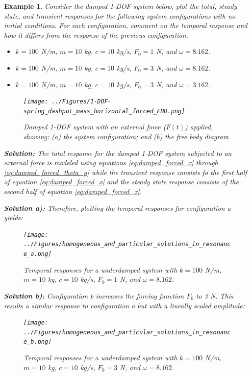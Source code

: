 \documentclass[12pt,letter]{article}
\newtheorem{ex}{Example}
\numberwithin{ex}{section} %
\newenvironment{example}{\begin{mdframed}[middlelinewidth=0.5mm]\begin{ex}\normalfont}{\end{ex}\end{mdframed}}
\numberwithin{re}{section} %
\begin{document}
			\begin{example}
			\label{ex:homogeneous_and_particular_solutions_in_resonance}		
				Consider the damped 1-DOF system below, plot the total, steady state, and transient responses for the following system configurations with no initial conditions. For each configuration, comment on the temporal response and how it differs from the response of the previous configuration.    
				
				\begin{itemize}
				\item[a)] $k=100$ N/m, $m=10$ kg,  $c=10$ kg/s, $F_0=1$ N, and $\omega = 8.162$.
				\item[b)] $k=100$ N/m, $m=10$ kg,  $c=10$ kg/s, $F_0=3$ N, and $\omega = 8.162$.
				\item[c)] $k=100$ N/m, $m=10$ kg,  $c=10$ kg/s, $F_0=3$ N, and $\omega = 3.162$.
				\end{itemize}
				
				\begin{figure}[H]
					\centering
					\texttt{[image: ../Figures/1-DOF-spring\_dashpot\_mass\_horizontal\_forced\_FBD.png]}
					\caption{Damped 1-DOF system with an external force ($F(t)$) applied, showing: (a) the system configuration; and (b) the free body diagram}
				\end{figure}
				
				\noindent\textbf{Solution:} The total response for the damped 1-DOF system subjected to an external force is modeled using equations \ref{eq:damped_forced_x} through \ref{eq:damped_forced_theta_p} while the transient response consists fo the first half of equation \ref{eq:damped_forced_x} and the steady state response consists of the second half of equation \ref{eq:damped_forced_x}.  
				
				
				\noindent\textbf{Solution a):} Therefore, plotting the temporal responses for configuration a yields:
				\begin{figure}[H]
					\centering
					\texttt{[image: ../Figures/homogeneous\_and\_particular\_solutions\_in\_resonance\_a.png]}
					\caption{Temporal responses for a underdamped system with $k=100$ N/m, $m=10$ kg,  $c=10$ kg/s, $F_0=1$ N, and $\omega = 8.162$.}
				\end{figure}			
				 
				\noindent\textbf{Solution b):} Configuration b increases the forcing function $F_0$ to 3 N. This results a similar response to configuration a but with a lineally scaled amplitude:
				\begin{figure}[H]
					\centering
					\texttt{[image: ../Figures/homogeneous\_and\_particular\_solutions\_in\_resonance\_b.png]}
					\caption{Temporal responses for a underdamped system with $k=100$ N/m, $m=10$ kg,  $c=10$ kg/s, $F_0=3$ N, and $\omega = 8.162$.}
				\end{figure}			
				

\end{example}
\end{document}
